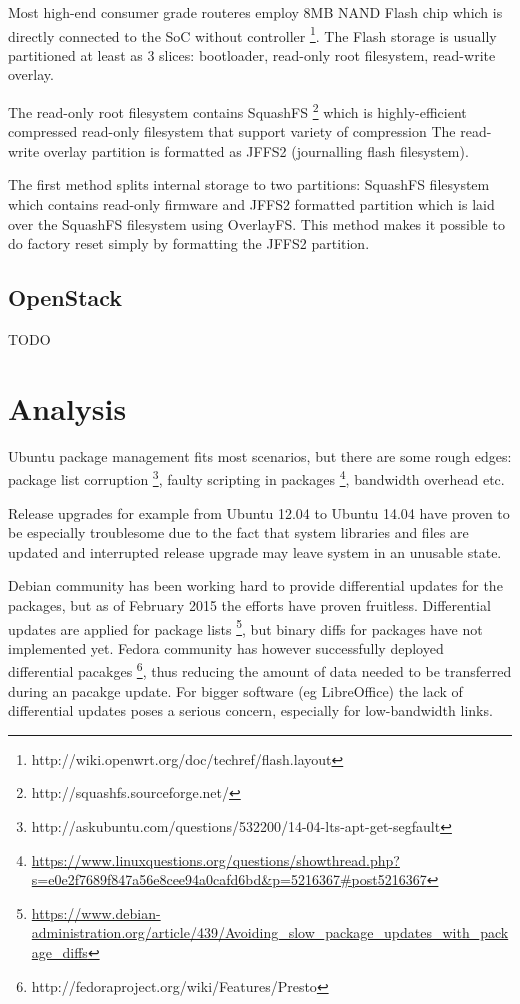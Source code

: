 \documentclass{article}
\begin{document}
Most high-end consumer grade routeres employ 8MB NAND Flash chip which is
directly connected to the SoC without controller
\footnote{http://wiki.openwrt.org/doc/techref/flash.layout}.
The Flash storage is usually partitioned at least as 3 slices:
bootloader, read-only root filesystem, read-write overlay.

The read-only root filesystem contains SquashFS
\footnote{http://squashfs.sourceforge.net/}
which is highly-efficient compressed read-only filesystem that support variety
of compression The read-write overlay partition is formatted as JFFS2
(journalling flash filesystem).

The first method splits internal storage to two partitions: SquashFS
filesystem which contains read-only firmware and JFFS2 formatted partition
which is laid over the SquashFS filesystem using OverlayFS. This method makes
it possible to do factory reset simply by formatting the JFFS2 partition.

\subsection{OpenStack}

TODO

\section{Analysis}

Ubuntu package management fits most scenarios, but there are some rough edges:
package list corruption
\footnote{http://askubuntu.com/questions/532200/14-04-lts-apt-get-segfault},
faulty scripting in packages
\footnote{\url{https://www.linuxquestions.org/questions/showthread.php?s=e0e2f7689f847a56e8cee94a0cafd6bd&p=5216367#post5216367}},
bandwidth overhead etc.

Release upgrades for example from Ubuntu 12.04 to Ubuntu 14.04
have proven to be especially troublesome due to the fact that system libraries
and files are updated and interrupted release upgrade may leave system
in an unusable state.

Debian community has been working hard to provide differential updates for
the packages, but as of February 2015 the efforts have proven fruitless.
Differential updates are applied for package lists
\footnote{\url{https://www.debian-administration.org/article/439/Avoiding_slow_package_updates_with_package_diffs}},
but binary diffs for packages have not implemented yet.
Fedora community has however successfully deployed differential pacakges
\footnote{http://fedoraproject.org/wiki/Features/Presto},
thus reducing the amount of data needed to be transferred during an pacakge update. For bigger software (eg LibreOffice) the lack of differential updates poses a serious concern, especially for low-bandwidth links.
\end{document}
